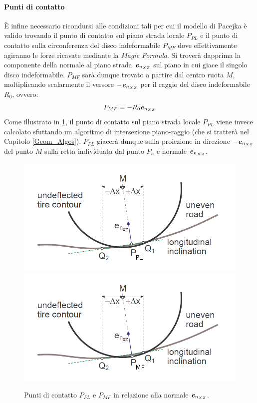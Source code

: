 \paragraph{Punti di contatto}
\label{Punti_contatto_rill}
È infine necessario ricondursi alle condizioni tali per cui il modello di Pacejka è valido trovando il punto di contatto sul piano strada locale $P_{PL}$ e il punto di contatto sulla circonferenza del disco indeformabile $P_{MF}$ dove effettivamente agiranno le forze ricavate mediante la \textit{Magic Formula}. Si troverà dapprima la componente della normale al piano strada $\textbf{\textit{e}}_{n_{XZ}}$ sul piano in cui giace il singolo disco indeformabile. $P_{MF}$ sarà dunque trovato a partire dal centro ruota $M$, moltiplicando scalarmente il versore $-\textbf{\textit{e}}_{n_{XZ}}$ per il raggio del disco indeformabile $R_0$, ovvero:
%
\begin{equation}
P_{MF} = -R_0\textbf{\textit{e}}_{n_{XZ}}
\label{puntoMF}
\end{equation}
%
Come illustrato in \figurename{ \ref{localplane}}, il punto di contatto sul piano strada locale $P_{PL}$ viene invece calcolato sfuttando un algoritmo di intersezione piano-raggio (che si tratterà nel Capitolo \ref{Geom_Algos}). $P_{PL}$ giacerà dunque sulla proiezione in direzione $-\textbf{\textit{e}}_{n_{XZ}}$ del punto $M$ sulla retta individuata dal punto $P_n$ e normale $\textbf{\textit{e}}_{n_{XZ}}$.

\begin{figure}[h]
	\centering
	\includegraphics[width=0.6\linewidth]{Figures/local_plane_PL}
	\includegraphics[width=0.6\linewidth]{Figures/local_plane_MF}
	\caption{Punti di contatto $P_{PL}$ e $P_{MF}$ in relazione alla normale $\textbf{\textit{e}}_{n_{XZ}}$.}
	\label{localplane}
\end{figure}

